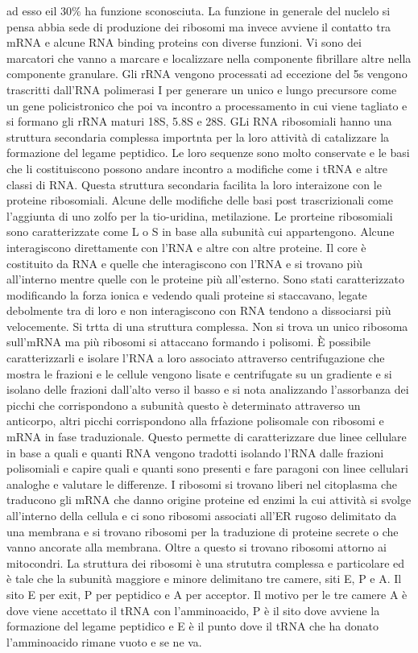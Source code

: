 ad esso eil $30\%$ ha funzione sconosciuta. La funzione in generale del nuclelo si pensa abbia sede di produzione dei ribosomi ma invece avviene il contatto tra mRNA e alcune RNA binding
proteins con diverse funzioni. Vi sono dei marcatori che vanno a marcare e localizzare nella componente fibrillare altre nella componente granulare. Gli rRNA vengono processati ad
eccezione del 5s vengono trascritti dall'RNA polimerasi I per generare un unico e lungo precursore come un gene policistronico che poi va incontro a processamento in cui viene tagliato
e si formano gli rRNA maturi 18S, 5.8S e 28S. GLi RNA ribosomiali hanno una struttura secondaria complessa importnta per la loro attivit\`a di catalizzare la formazione del legame 
peptidico. Le loro sequenze sono molto conservate e le basi che li costituiscono possono andare incontro a modifiche come i tRNA e altre classi di RNA. Questa struttura secondaria 
facilita la loro interaizone con le proteine ribosomiali. Alcune delle modifiche delle basi post trascrizionali come l'aggiunta di uno zolfo per la tio-uridina, metilazione. Le prorteine
ribosomiali sono caratterizzate come L o S in base alla subunit\`a cui appartengono. Alcune interagiscono direttamente con l'RNA e altre con altre proteine. Il core \`e costituito da RNA
e quelle che interagiscono con l'RNA e si trovano pi\`u all'interno mentre quelle con le proteine pi\`u all'esterno. Sono stati caratterizzato modificando la forza ionica e vedendo quali
proteine si staccavano, legate debolmente tra di loro e non interagiscono con RNA tendono a dissociarsi pi\`u velocemente. Si trtta di una struttura complessa. Non si trova un unico 
ribosoma sull'mRNA ma pi\`u ribosomi si attaccano formando i polisomi. \`E possibile caratterizzarli e isolare l'RNA a loro associato attraverso centrifugazione che mostra le frazioni
e le cellule vengono lisate e centrifugate su un gradiente e si isolano delle frazioni dall'alto verso il basso e si nota analizzando l'assorbanza dei picchi che corrispondono a 
subunit\`a questo \`e determinato attraverso un anticorpo, altri picchi corrispondono alla frfazione polisomale con ribosomi e mRNA in fase traduzionale. Questo permette di 
caratterizzare due linee cellulare in base a quali e quanti RNA vengono tradotti isolando l'RNA dalle frazioni polisomiali e capire quali e quanti sono presenti e fare paragoni con 
linee cellulari analoghe e valutare le differenze. I ribosomi si trovano liberi nel citoplasma che traducono gli mRNA che danno origine proteine ed enzimi la cui attivit\`a si svolge
all'interno della cellula e ci sono ribosomi associati all'ER rugoso delimitato da una membrana e si trovano ribosomi per la traduzione di proteine secrete o che vanno ancorate alla 
membrana. Oltre a questo si trovano ribosomi attorno ai mitocondri. La struttura dei ribosomi \`e una strututra complessa e particolare ed \`e tale che la subunit\`a maggiore e minore
delimitano tre camere, siti E, P e A. Il sito E per exit, P per peptidico e A per acceptor. Il motivo per le tre camere A \`e dove viene accettato il tRNA con l'amminoacido, P \`e il
sito dove avviene la formazione del legame peptidico e E \`e il punto dove il tRNA che ha donato l'amminoacido rimane vuoto e se ne va. 
